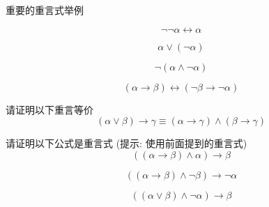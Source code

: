 \begin{frame}{}
  \begin{exampleblock}{重要的重言式举例}
    \begin{description}[<+->][双重否定律:]
      \setlength{\itemsep}{8pt}
      \item[双重否定律:]
        \[
          \lnot \lnot \alpha \leftrightarrow \alpha
        \]
      \item[排中律:]
        \[
          \alpha \lor (\lnot \alpha)
        \]
      \item[矛盾律:]
        \[
          \lnot (\alpha \land \lnot \alpha)
        \]
      \item[逆否命题:]
        \[
          (\alpha \to \beta) \leftrightarrow (\lnot \beta \to \lnot \alpha)
        \]
    \end{description}
  \end{exampleblock}
\end{frame}

\begin{frame}{}
  \begin{exampleblock}{请证明以下重言等价}
    \[
      (\alpha \lor \beta) \to \gamma \equiv (\alpha \to \gamma) \land (\beta \to \gamma)
    \]
  \end{exampleblock}
\end{frame}

\begin{frame}{}
  \begin{exampleblock}{请证明以下公式是重言式 (提示: 使用前面提到的重言式)}
    \[
      ((\alpha \to \beta) \land \alpha) \to \beta
    \]

    \pause
    \[
      ((\alpha \to \beta) \land \lnot \beta) \to \lnot \alpha
    \]

    \pause
    \[
      ((\alpha \lor \beta) \land \lnot \alpha) \to \beta
    \]
  \end{exampleblock}
\end{frame}

